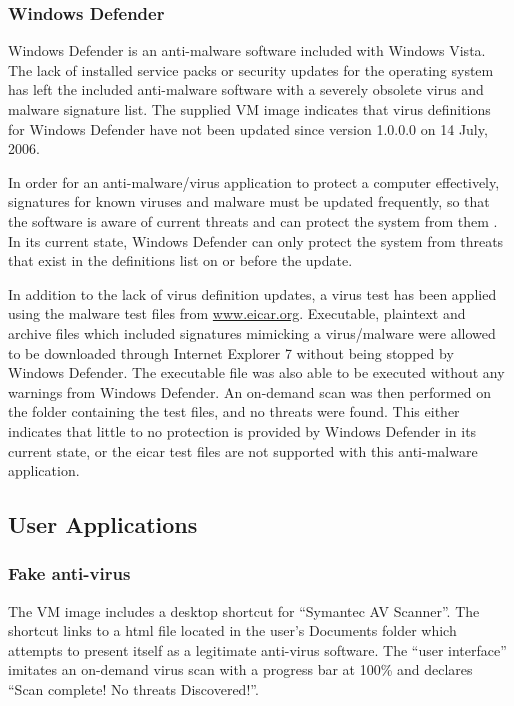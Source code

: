 \subsubsection{Windows Defender}

Windows Defender is an anti-malware software included with Windows Vista. The lack of installed service packs or security updates for the operating system has left the included anti-malware software with a severely obsolete virus and malware signature list. The supplied VM image indicates that virus definitions for Windows Defender have not been updated since version 1.0.0.0 on 14 July, 2006.

In order for an anti-malware/virus application to protect a computer effectively, signatures for known viruses and malware must be updated frequently, so that the software is aware of current threats and can protect the system from them \citep{Goodrich2011}. In its current state, Windows Defender can only protect the system from threats that exist in the definitions list on or before the update.

In addition to the lack of virus definition updates, a virus test has been applied using the malware test files from \href{http://www.eicar.org/85-0-Download.html}{www.eicar.org}. Executable, plaintext and archive files which included signatures mimicking a virus/malware were allowed to be downloaded through Internet Explorer 7 without being stopped by Windows Defender. The executable file was also able to be executed without any warnings from Windows Defender. An on-demand scan was then performed on the folder containing the test files, and no threats were found. This either indicates that little to no protection is provided by Windows Defender in its current state, or the eicar test files are not supported with this anti-malware application.

\subsection{User Applications}

\subsubsection{Fake anti-virus}

The VM image includes a desktop shortcut for ``Symantec AV Scanner''. The shortcut links to a html file located in the user's Documents folder which attempts to present itself as a legitimate anti-virus software. The ``user interface'' imitates an on-demand virus scan with a progress bar at 100\% and declares ``Scan complete! No threats Discovered!''.

